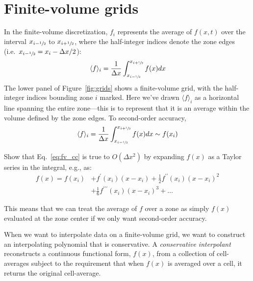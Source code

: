 \section{Finite-volume grids}

In the finite-volume discretization, $f_i$ represents the average of
$f(x,t)$ over the interval $x_{i-\sfrac{1}{2}}$ to $x_{i+\sfrac{1}{2}}$, where
the half-integer indices denote the zone edges (i.e.\ $x_{i-\sfrac{1}{2}} =
x_i - \Delta x/2$):
\begin{equation}
\label{eq:fv_cc-a}
\langle f\rangle_i = \frac{1}{\Delta x} \int_{x_{i-\sfrac{1}{2}}}^{x_{i+\sfrac{1}{2}}} f(x) dx
\end{equation}
The lower panel of Figure~\ref{fig:grids} shows a finite-volume grid,
with the half-integer indices bounding zone $i$ marked.
%
%
Here we've drawn $\langle f\rangle_i$ as a horizontal line spanning the entire zone---this
is to represent that it is an average within the volume defined by the zone
edges.
%
To second-order accuracy,
\begin{equation}
\label{eq:fv_cc}
\langle f\rangle_i = \frac{1}{\Delta x} \int_{x_{i-\sfrac{1}{2}}}^{x_{i+\sfrac{1}{2}}} f(x) dx \sim f(x_i)
\end{equation}

\begin{exercise}
{Show that Eq.~\ref{eq:fv_cc} is true to $O(\Delta x^2)$ by expanding
$f(x)$ as a Taylor series in the integral, e.g., as:
\begin{align}
f(x) = f(x_i) &+ f^\prime(x_i) (x - x_i) + \frac{1}{2} f^{\prime\prime}(x_i) (x - x_i)^2 \nonumber \\
%
 &+ \frac{1}{6} f^{\prime\prime\prime}(x_i) (x - x_i)^3 + \ldots
\end{align}
}
\end{exercise}

This means that we can treat the average of $f$ over a zone as simply $f(x)$
evaluated at the zone center if we only want second-order accuracy.

When we want to interpolate data on a finite-volume grid, we want to
construct an interpolating polynomial that is conservative.  A {\em
  conservative interpolant} reconstructs a continuous functional form,
$f(x)$, from a collection of cell-averages subject to the requirement
that when $f(x)$ is averaged over a cell, it returns the original
cell-average.

